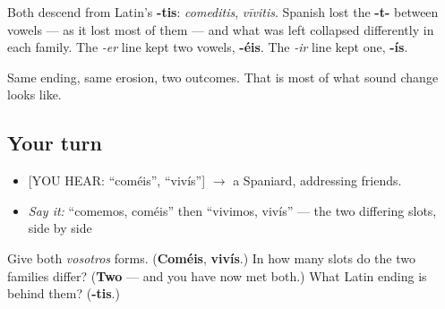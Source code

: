 \begin{cousinweb}
Both descend from Latin's \textbf{-tis}: \emph{comeditis}, \emph{vīvitis}. Spanish lost the \textbf{-t-} between vowels — as it lost most of them — and what was left collapsed differently in each family. The \emph{-er} line kept two vowels, \textbf{-éis}. The \emph{-ir} line kept one, \textbf{-ís}.

Same ending, same erosion, two outcomes. That is most of what sound change looks like.
\end{cousinweb}

\subsection*{Your turn}
\begin{itemize}
\raggedright
  \item {[}YOU HEAR: \textquotedblleft{}coméis\textquotedblright{}, \textquotedblleft{}vivís\textquotedblright{}{]} $\to$ a Spaniard, addressing friends.
  \item \emph{Say it:} \textquotedblleft{}comemos, coméis\textquotedblright{} then \textquotedblleft{}vivimos, vivís\textquotedblright{} — the two differing slots, side by side
\end{itemize}

\begin{tcolorbox}[breakable,colback=teal!4,colframe=teal!35!black,title={Before you move on}]
Give both \emph{vosotros} forms. (\textbf{Coméis}, \textbf{vivís}.) In how many slots do the two families differ? (\textbf{Two} — and you have now met both.) What Latin ending is behind them? (\textbf{-tis}.)
\end{tcolorbox}
